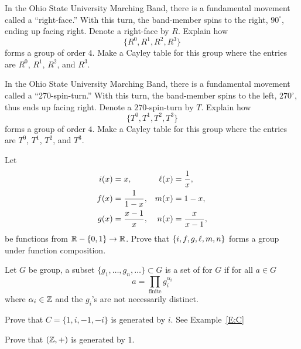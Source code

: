 \documentclass{ximera}
\begin{document}
\begin{exercise}
  In the Ohio State University Marching Band, there is a fundamental
  movement called a ``right-face.'' With this turn, the band-member
  spins to the right, $90^\circ$, ending up facing right. Denote a
  right-face by $R$. Explain how
  \[
  \{R^0,R^1,R^2,R^3\}
  \]
  forms a group of order $4$. Make a Cayley table for this group where the entries
  are $R^0$, $R^1$, $R^2$, and $R^3$.
\end{exercise}

\begin{exercise}
  In the Ohio State University Marching Band, there is a fundamental
  movement called a ``270-spin-turn.'' With this turn, the band-member
  spins to the left, $270^\circ$, thus ends up facing right. Denote a
  $270$-spin-turn by $T$. Explain how
  \[
  \{T^0,T^1,T^2,T^3\}
  \]
  forms a group of order $4$. Make a Cayley table for this group where
  the entries are $T^0$, $T^1$, $T^2$, and $T^3$.
\end{exercise}



\begin{exercise}\label{E:invg}
  Let
  \begin{align*}
    i(x) &= x,             & \ell(x) &= \frac{1}{x}, \\
    f(x) &= \frac{1}{1-x}, &  m(x) &= 1-x, \\
    g(x) &= \frac{x-1}{x}, &  n(x) &= \frac{x}{x-1},
  \end{align*}
  be functions from $\mathbb R-\{0,1\}\to\mathbb R$.  Prove that $\{i,f,g,\ell,m,n\}$
  forms a group under function composition.
\end{exercise}


\begin{definition}
  Let $G$ be group, a subset $\{g_1,\dots, g_n,\dots\}\subset G$ is a
  set of  for $G$ if for all $a\in G$
  \[
  a = \prod_{\mathrm{finite}} g_i^{\alpha_i}
  \]
  where $\alpha_i\in \mathbb Z$ and the $g_i$'s are not necessarily distinct.
\end{definition}


\begin{exercise}
  Prove that $C =\{1,i,-1,-i\}$ is generated by $i$. See Example~\ref{E:C}
\end{exercise}

\begin{exercise}
  Prove that $(\mathbb Z,+)$ is generated by $1$.
\end{exercise}
\end{document}
